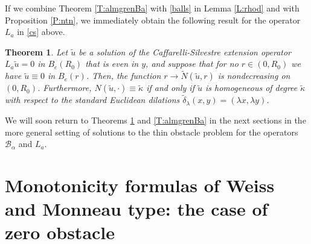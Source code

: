 \documentclass[11pt]{amsart}
\theoremstyle{plain}
\newtheorem{thrm}{Theorem}[section]
\numberwithin{equation}{section}
\begin{document}
If we combine Theorem \ref{T:almgrenBa} with \eqref{balls} in Lemma \ref{L:rhod} and with Proposition \ref{P:ntn}, we immediately obtain the following result for the operator $L_a$ in \eqref{cs} above.

\begin{thrm}\label{T:almgrenEO}
Let $\tilde u$ be a solution of the Caffarelli-Silvestre extension operator $L_a \tilde u = 0$ in $B_{e}(R_0)$ that is even in $y$, and suppose that for no $r\in (0,R_0)$ we have $\tilde u\equiv 0$ in $B_e(r)$. Then, the function $r\to \tilde N(\tilde u,r)$ is nondecreasing on $(0,R_0)$. Furthermore, $N(\tilde u,\cdot) \equiv \tilde \kappa$ if and only if $\tilde u$ is homogeneous of degree $\tilde \kappa$ with respect to the standard Euclidean dilations $\tilde \delta_\lambda(x,y) = ({\lambda} x,{\lambda} y)$.
\end{thrm}

We will soon return to Theorems \ref{T:almgrenEO} and \ref{T:almgrenBa} in the next sections in the more general setting of solutions to the thin obstacle problem for the operators ${\mathcal{B}_\alpha}$ and $L_a$.

\section{Monotonicity formulas of Weiss and Monneau type: the case of zero obstacle}\label{S:op}
\end{document}
